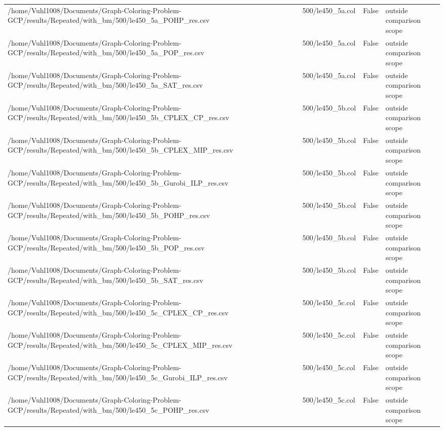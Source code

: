 \begin{table}[htbp]
\begin{tabular}{llll}
/home/Vuhl1008/Documents/Graph-Coloring-Problem-GCP/results/Repeated/with\_bm/500/le450\_5a\_POHP\_res.csv & 500/le450\_5a.col & False & outside comparison scope \\
/home/Vuhl1008/Documents/Graph-Coloring-Problem-GCP/results/Repeated/with\_bm/500/le450\_5a\_POP\_res.csv & 500/le450\_5a.col & False & outside comparison scope \\
/home/Vuhl1008/Documents/Graph-Coloring-Problem-GCP/results/Repeated/with\_bm/500/le450\_5a\_SAT\_res.csv & 500/le450\_5a.col & False & outside comparison scope \\
/home/Vuhl1008/Documents/Graph-Coloring-Problem-GCP/results/Repeated/with\_bm/500/le450\_5b\_CPLEX\_CP\_res.csv & 500/le450\_5b.col & False & outside comparison scope \\
/home/Vuhl1008/Documents/Graph-Coloring-Problem-GCP/results/Repeated/with\_bm/500/le450\_5b\_CPLEX\_MIP\_res.csv & 500/le450\_5b.col & False & outside comparison scope \\
/home/Vuhl1008/Documents/Graph-Coloring-Problem-GCP/results/Repeated/with\_bm/500/le450\_5b\_Gurobi\_ILP\_res.csv & 500/le450\_5b.col & False & outside comparison scope \\
/home/Vuhl1008/Documents/Graph-Coloring-Problem-GCP/results/Repeated/with\_bm/500/le450\_5b\_POHP\_res.csv & 500/le450\_5b.col & False & outside comparison scope \\
/home/Vuhl1008/Documents/Graph-Coloring-Problem-GCP/results/Repeated/with\_bm/500/le450\_5b\_POP\_res.csv & 500/le450\_5b.col & False & outside comparison scope \\
/home/Vuhl1008/Documents/Graph-Coloring-Problem-GCP/results/Repeated/with\_bm/500/le450\_5b\_SAT\_res.csv & 500/le450\_5b.col & False & outside comparison scope \\
/home/Vuhl1008/Documents/Graph-Coloring-Problem-GCP/results/Repeated/with\_bm/500/le450\_5c\_CPLEX\_CP\_res.csv & 500/le450\_5c.col & False & outside comparison scope \\
/home/Vuhl1008/Documents/Graph-Coloring-Problem-GCP/results/Repeated/with\_bm/500/le450\_5c\_CPLEX\_MIP\_res.csv & 500/le450\_5c.col & False & outside comparison scope \\
/home/Vuhl1008/Documents/Graph-Coloring-Problem-GCP/results/Repeated/with\_bm/500/le450\_5c\_Gurobi\_ILP\_res.csv & 500/le450\_5c.col & False & outside comparison scope \\
/home/Vuhl1008/Documents/Graph-Coloring-Problem-GCP/results/Repeated/with\_bm/500/le450\_5c\_POHP\_res.csv & 500/le450\_5c.col & False & outside comparison scope \\

\end{tabular}
\end{table}
